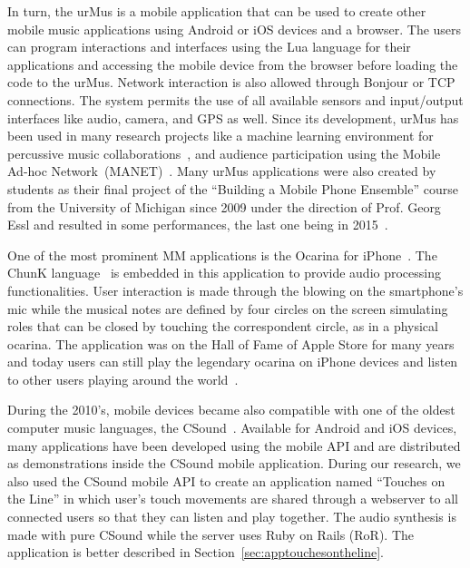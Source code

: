 In turn, the urMus is a mobile application that can be used to create other mobile music applications using Android or iOS devices and a browser.
The users can program interactions and interfaces using the Lua language for their applications and accessing the mobile device from the browser before loading the code to the urMus.
Network interaction is also allowed through Bonjour or TCP connections. 
The system permits the use of all available sensors and input/output interfaces like audio, camera, and GPS as well.
Since its development, urMus has been used in many research projects like a machine learning environment for percussive music collaborations~\citep{Derbinsky2012exploring}, and audience participation using the Mobile Ad-hoc Network~(MANET)~\citep{Lee2014manet}.
Many urMus applications were also created by students as their final project of the ``Building a Mobile Phone Ensemble'' course from the University of Michigan since 2009 under the direction of Prof. Georg Essl and resulted in some performances, the last one being in 2015~\citep{michigan2017mobilephoneensempleperformance}.

One of the most prominent MM applications is the Ocarina for iPhone~\citep{Wang2008domobilephones}.
The ChunK language~\citep{wang2003chuck} is embedded in this application to provide audio processing functionalities.
User interaction is made through the blowing on the smartphone's mic while the musical notes are defined by four circles on the screen simulating roles that can be closed by touching the correspondent circle, as in a physical ocarina.
The application was on the Hall of Fame of Apple Store for many years and today users can still play the legendary ocarina on iPhone devices and listen to other users playing around the world~\citep{Wang2014ocarina}. 

During the 2010's, mobile devices became also compatible with one of the oldest computer music languages, the CSound~\citep{vercoe1990csound}.
Available for Android and iOS devices, many applications have been developed using the mobile API and are distributed as demonstrations inside the CSound mobile application.
During our research, we also used the CSound mobile API to create an application named ``Touches on the Line'' in which user's touch movements are shared through a webserver to all connected users so that they can listen and play together.
The audio synthesis is made with pure CSound while the server uses Ruby on Rails (RoR).
The application is better described in Section~\ref{sec:apptouchesontheline}.

